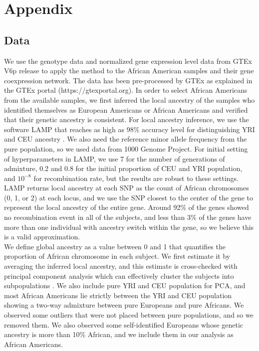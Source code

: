 \documentclass[12pt]{extarticle}
\theoremstyle{theorem}
\begin{document}
\section{Appendix}

\subsection{Data}
 We use the genotype data and normalized gene expression level data from GTEx V6p release \cite{lonsdale2013genotype} to apply the method to the African American samples and their gene coexpression network. The data has been pre-processed by GTEx as explained in the GTEx portal (https://gtexportal.org). In order to select African Americans from the available samples, we first inferred the local ancestry of the samples who identified themselves as European Americans or African Americans and verified that their genetic ancestry is consistent. For local ancestry inference, we use the software LAMP that reaches as high as 98\% accuracy level for distinguishing YRI and CEU ancestry \cite{pacsaniuc2009imputation}. We also need the reference minor allele frequency from the pure population, so we used data from 1000 Genome Project. For initial setting of hyperparameters in LAMP, we use 7 for the number of generations of admixture, 0.2 and 0.8 for the initial proportion of CEU and YRI population, and $10^{-8}$ for recombination rate, but the results are robust to these settings. LAMP returns local ancestry at each SNP as the count of African chromosomes (0, 1, or 2) at each locus, and we use the SNP closest to the center of the gene to represent the local ancestry of the entire gene.  Around 92\% of the genes showed no recombination event in all of the subjects, and less than 3\% of the genes have more than one individual with ancestry switch within the gene, so we believe this is a valid approximation. \\


\noindent We define global ancestry as a value between 0 and 1 that quantifies the proportion of African chromosome in each subject. We first estimate it by averaging the inferred local ancestry, and this estimate is cross-checked with principal component analysis which can effectively cluster the subjects into subpopulations \cite{pritchard2000inference}. We also include pure YRI and CEU population for PCA, and most African Americans lie strictly between the YRI and CEU population showing a two-way admixture between pure Europeans and pure Africans. We observed some outliers that were not placed between pure populations, and so we removed them. We also observed some self-identified Europeans whose genetic ancestry is more than 10\% African, and we include them in our analysis as African Americans. \\
\end{document}
